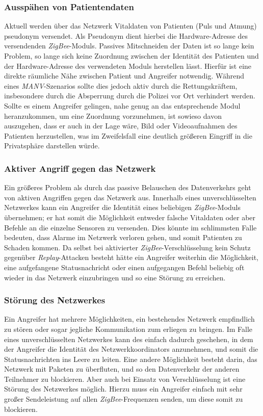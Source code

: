 \subsubsection{Ausspähen von Patientendaten}
Aktuell werden über das Netzwerk Vitaldaten von Patienten (Puls und Atmung) pseudonym versendet. Als Pseudonym dient 
hierbei die Hardware-Adresse des versendenden \emph{ZigBee}-Moduls. Passives Mitschneiden der Daten ist so lange kein Problem,
so lange sich keine Zuordnung zwischen der Identität des Patienten und der Hardware-Adresse des verwendeten Moduls
herstellen lässt. Hierfür ist eine direkte räumliche Nähe zwischen Patient und Angreifer notwendig. 
Während eines \emph{MANV}-Szenarios sollte dies jedoch aktiv durch die Rettungskräftem, insbesondere durch die Absperrung 
durch die Polizei vor Ort verhindert werden. Sollte es einem Angreifer gelingen, nahe genug an das entsprechende Modul
heranzukommen, um eine Zuordnung vorzunehmen, ist sowieso davon auszugehen, dass er auch in der Lage wäre, Bild oder
Videoaufnahmen des Patienten herzustellen, was im Zweifelsfall eine deutlich größeren Eingriff in die Privatsphäre 
darstellen würde.

\subsubsection{Aktiver Angriff gegen das Netzwerk}
Ein größeres Problem als durch das passive Belauschen des Datenverkehrs geht von aktiven Angriffen gegen das Netzwerk
aus. Innerhalb eines unverschlüsselten Netzwerkes kann ein Angreifer die Identität eines beliebigen \emph{ZigBee}-Moduls 
übernehmen; er hat somit die Möglichkeit entweder falsche Vitaldaten oder aber Befehle an die einzelne Sensoren zu
versenden. Dies könnte im schlimmsten Falle bedeuten, dass Alarme im Netzwerk verloren gehen, und somit Patienten
zu Schaden kommen. Da selbst bei aktivierter \emph{ZigBee}-Verschlüsselung kein Schutz gegenüber 
\emph{Replay}-Attacken besteht hätte
ein Angreifer weiterhin die Möglichkeit, eine aufgefangene Statusnachricht oder einen aufgegangen Befehl beliebig oft
wieder in das Netzwerk einzubringen und so eine Störung zu erreichen.

\subsubsection{Störung des Netzwerkes}
Ein Angreifer hat mehrere Möglichkeiten, ein bestehendes Netzwerk empfindlich zu stören oder sogar jegliche Kommunikation
zum erliegen zu bringen. Im Falle eines unverschlüsselten Netzwerkes kann des einfach dadurch geschehen, in dem
der Angreifer die Identität des Netzwerkkoordinators anzunehmen, und somit die Statusnachrichten ins Leere zu leiten. Eine
andere Möglichkeit besteht darin, das Netzwerk mit Paketen zu überfluten, und so den Datenverkehr der anderen Teilnehmer
zu blockieren. Aber auch bei Einsatz von Verschlüsselung ist eine Störung des Netzwerkes möglich. Hierzu muss ein Angreifer
einfach mit sehr großer Sendeleistung auf allen \emph{ZigBee}-Frequenzen senden, um diese somit zu blockieren. 


